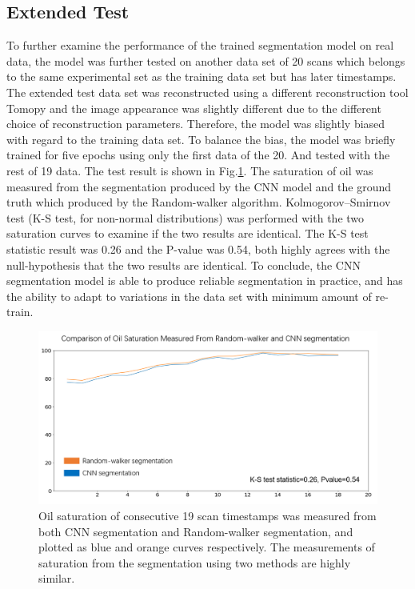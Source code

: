 \documentclass[draft,linenumbers]{agujournal2018}
\begin{document}
\subsection{Extended Test}
To further examine the performance of the trained segmentation model on real data, the model was further tested on another data set of 20 scans which belongs to the same experimental set as the training data set but has later timestamps. The extended test data set was reconstructed using a different reconstruction tool Tomopy \citep{gursoy2014tomopy} and the image appearance was slightly different due to the different choice of reconstruction parameters. Therefore, the model was slightly biased with regard to the training data set. To balance the bias, the model was briefly trained for five epochs using only the first data of the 20. And tested with the rest of 19 data. The test result is shown in Fig.\ref{extendedtest}. The saturation of oil was measured from the segmentation produced by the CNN model and the ground truth which produced by the Random-walker algorithm. Kolmogorov–Smirnov test (K-S test, for non-normal distributions) was performed with the two saturation curves to examine if the two results are identical. The K-S test statistic result was 0.26 and the P-value was 0.54, both highly agrees with the null-hypothesis that the two results are identical. To conclude, the CNN segmentation model is able to produce reliable segmentation in practice, and has the ability to adapt to variations in the data set with minimum amount of re-train.

\begin{figure}[h]
 \centering
 \includegraphics[width=33pc]{imgs/extendedtestresult.png}
 \caption{Oil saturation of consecutive 19 scan timestamps was measured from both CNN segmentation and Random-walker segmentation, and plotted as blue and orange curves respectively. The measurements of saturation from the segmentation using two methods are highly similar.}
 \label{extendedtest}
 \end{figure}
\end{document}
